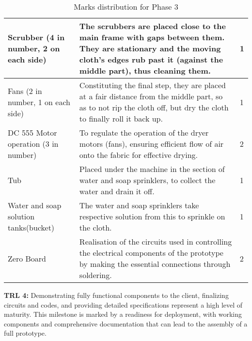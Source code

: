\documentclass[table,french,english]{rapportCS}
\begin{document}
\clearpage
\begin{table}[h]
\begin{center}
\begin{tabular}{|p{3cm}|p{10cm}|p{1.8cm}|}
\hline
Scrubber (4 in number, 2 on each side)	& The scrubbers are placed close to the main frame with gaps between them. They are stationary and the moving cloth’s edges rub past it (against the middle part), thus cleaning them. & 1 \\
\hline
Fans (2 in number, 1 on each side) & Constituting the final step, they are placed at a fair distance from the middle part, so as to not rip the cloth off, but dry the cloth to finally roll it back up. & 1\\
\hline
DC 555 Motor operation (3 in number) & To regulate the operation of the dryer motors (fans), ensuring efficient flow of air onto the fabric for effective drying.& 2 \\
\hline
Tub	& Placed under the machine in the section of water and soap sprinklers, to collect the water and drain it off. & 1 \\
\hline
Water and soap solution tanks(bucket) & The water and soap sprinklers take respective solution from this to sprinkle on the cloth. & 1 \\
\hline
Zero Board & Realisation of the circuits used in controlling the electrical components of the prototype by making the essential connections through soldering. & 2 \\
\hline

\end{tabular}
\caption{Marks distribution for Phase 3}
\end{center}
\end{table}

\textbf{TRL 4:} Demonstrating fully functional components to the client, finalizing circuits and codes, and providing detailed specifications represent a high level of maturity. This milestone is marked by a readiness for deployment, with working components and comprehensive documentation that can lead to the assembly of a full prototype.
\end{document}
